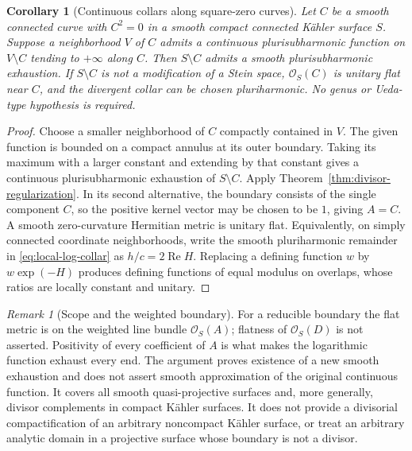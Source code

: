 \documentclass[11pt]{amsart}
\newtheorem{corollary}[theorem]{Corollary}
\theoremstyle{definition}
\theoremstyle{remark}
\newtheorem{remark}[theorem]{Remark}
\numberwithin{equation}{section}
\begin{document}
\begin{corollary}[Continuous collars along square-zero curves]
\label{cor:square-zero-continuous-collar}
Let $C$ be a smooth connected curve with $C^2=0$ in a smooth compact
connected K\"ahler surface $S$.  Suppose a neighborhood $V$ of $C$ admits
a continuous plurisubharmonic function on $V\setminus C$ tending
to $+\infty$ along $C$.  Then $S\setminus C$ admits a smooth
plurisubharmonic exhaustion.  If $S\setminus C$ is not a
modification of a Stein space, $\mathcal O_S(C)$ is unitary flat
near $C$, and the divergent collar can be chosen pluriharmonic.
No genus or Ueda-type hypothesis is required.
\end{corollary}

\begin{proof}
Choose a smaller neighborhood of $C$ compactly contained in $V$.
The given function is bounded on a compact annulus at its outer
boundary.  Taking its maximum with a larger constant and extending
by that constant gives a continuous plurisubharmonic exhaustion
of $S\setminus C$.  Apply
Theorem~\ref{thm:divisor-regularization}.  In its second alternative,
the boundary consists of the single component $C$, so the positive
kernel vector may be chosen to be $1$, giving $A=C$.  A smooth
zero-curvature Hermitian metric is unitary flat.  Equivalently, on
simply connected coordinate neighborhoods, write the smooth
pluriharmonic remainder in \eqref{eq:local-log-collar} as
$h/c=2\operatorname{Re}H$.  Replacing a defining function $w$ by
$w\exp(-H)$ produces defining functions of equal modulus on
overlaps, whose ratios are locally constant and unitary.
\end{proof}

\begin{remark}[Scope and the weighted boundary]
\label{rem:regularization-scope}
For a reducible boundary the flat metric is on the weighted line
bundle $\mathcal O_S(A)$; flatness of
$\mathcal O_S(D)$ is not asserted.  Positivity of every coefficient
of $A$ is what makes the logarithmic function exhaust every end.
The argument proves existence of a new smooth exhaustion and does
not assert smooth approximation of the original continuous function.
It covers all smooth quasi-projective surfaces and, more generally,
divisor complements in compact K\"ahler surfaces.  It does not
provide a divisorial compactification of an arbitrary noncompact
K\"ahler surface, or treat an arbitrary analytic domain in a
projective surface whose boundary is not a divisor.
\end{remark}
\end{document}
